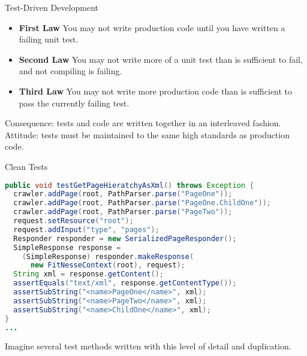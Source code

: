 \documentclass{beamer}
\author[Chris Simpkins] 
{Christopher Simpkins \\\texttt{chris.simpkins@gatech.edu}}
\institute[Georgia Tech] %
\date[CS 1331]{}
\begin{document}
\begin{frame}
  \titlepage
\end{frame}



\begin{frame}[fragile]{Test-Driven Development}

\begin{itemize}
\item {\bf First Law} You may not write production code until you have written a failing unit test.
\item {\bf Second Law} You may not write more of a unit test than is sufficient to fail, and not compiling is failing.
\item {\bf Third Law} You may not write more production code than is sufficient to pass the currently failing test.
\end{itemize}

Consequence: tests and code are written together in an interleaved fashion.\\
\vspace{.1in}
Attitude: tests must be maintained to the same high standards as production code.


\end{frame}

\begin{frame}[fragile]{Clean Tests}

\begin{lstlisting}[language=Java]
public void testGetPageHieratchyAsXml() throws Exception {
  crawler.addPage(root, PathParser.parse("PageOne"));
  crawler.addPage(root, PathParser.parse("PageOne.ChildOne"));
  crawler.addPage(root, PathParser.parse("PageTwo"));
  request.setResource("root");
  request.addInput("type", "pages");
  Responder responder = new SerializedPageResponder();
  SimpleResponse response = 
    (SimpleResponse) responder.makeResponse(
      new FitNesseContext(root), request);
  String xml = response.getContent();
  assertEquals("text/xml", response.getContentType());
  assertSubString("<name>PageOne</name>", xml);
  assertSubString("<name>PageTwo</name>", xml);
  assertSubString("<name>ChildOne</name>", xml);
}
...
\end{lstlisting}
Imagine several test methods written with this level of detail and duplication.

\end{frame}
\end{document}
